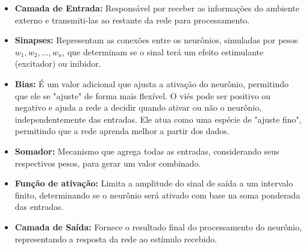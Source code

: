    \begin{itemize}
        \item \textbf{Camada de Entrada: }Responsável por receber as informações do ambiente 
        externo e transmiti-las ao restante da rede para processamento.
        \item \textbf{Sinapses: }Representam as conexões entre os neurônios, simuladas por pesos 
        \( w_1, w_2, \dots, w_n \), que determinam se o sinal terá um efeito estimulante (excitador) ou 
        inibidor.
        \item \textbf{Bias: }É um valor adicional que ajusta a ativação do neurônio, permitindo que ele 
        se "ajuste" de forma mais flexível. O viés pode ser positivo ou negativo e ajuda a rede a decidir 
        quando ativar ou não o neurônio, independentemente das entradas. Ele atua como uma espécie de 
        "ajuste fino", permitindo que a rede aprenda melhor a partir dos dados.
        \item \textbf{Somador: }Mecanismo que agrega todas as entradas, considerando seus respectivos 
        pesos, para gerar um valor combinado.
        \item \textbf{Função de ativação: }Limita a amplitude do sinal de saída a um intervalo finito, 
        determinando se o neurônio será ativado com base na soma ponderada das entradas.
        \item \textbf{Camada de Saída: }Fornece o resultado final do processamento do neurônio, 
        representando a resposta da rede ao estímulo recebido.
    
    \end{itemize}

